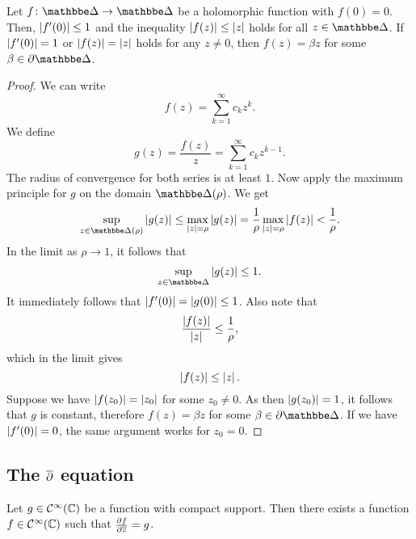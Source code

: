\begin{izrek}
Let $f \colon \dsk \to \dsk$ be a holomorphic function with
$f(0) = 0$. Then, $\left\lvert f'(0)\right\rvert \leq 1$ and the inequality
$\left\lvert f(z)\right\rvert \leq \left\lvert z\right\rvert$ holds for all $z \in \dsk$. If
$\left\lvert f'(0)\right\rvert = 1$ or $\left\lvert f(z)\right\rvert = \left\lvert z\right\rvert$ holds for any
$z \ne 0$, then $f(z) = \beta z$ for some
$\beta \in \partial \dsk$.
\end{izrek}

\begin{proof}
We can write
\[
f(z) = \sum_{k=1}^\infty c_k z^k.
\]
We define
\[
g(z) = \frac{f(z)}{z} = \sum_{k=1}^\infty c_k z^{k-1}.
\]
The radius of convergence for both series is at least $1$. Now
apply the maximum principle for $g$ on the domain $\dsk(\rho)$. We
get
\[
\sup_{z \in \dsk(\rho)} \abs{g(z)} \leq
\max_{\abs{z} = \rho} \abs{g(z)} =
\frac{1}{\rho} \max_{\abs{z} = \rho} \abs{f(z)} <
\frac{1}{\rho}.
\]
In the limit as $\rho \to 1$, it follows that
\[
\sup_{z \in \dsk} \abs{g(z)} \leq 1.
\]
It immediately follows that $\left\lvert f'(0)\right\rvert = \left\lvert g(0)\right\rvert \leq 1$. Also
note that
\[
\frac{\left\lvert f(z)\right\rvert}{\left\lvert z\right\rvert} \leq \frac{1}{\rho},
\]
which in the limit gives
\[
\left\lvert f(z)\right\rvert \leq \left\lvert z\right\rvert.
\]
Suppose we have $\left\lvert f(z_0)\right\rvert = \left\lvert z_0\right\rvert$ for some $z_0 \ne 0$. As
then $\left\lvert g(z_0)\right\rvert = 1$, it follows that $g$ is constant, therefore
$f(z) = \beta z$ for some $\beta \in \partial \dsk$. If we have
$\left\lvert f'(0)\right\rvert = 0$, the same argument works for $z_0 = 0$.
\end{proof}

\newpage

\subsection{The \texorpdfstring{$\overline{\partial}$}{d} equation}

\begin{lema}
\label{hol:lem:bound_diff}
Let $g \in \mathcal{C}^\infty(\mathbb{C})$ be a function with compact
support. Then there exists a function
$f \in \mathcal{C}^\infty(\mathbb{C})$ such that $\frac{\partial f}{\partial \overline{z}} = g$.
\end{lema}

